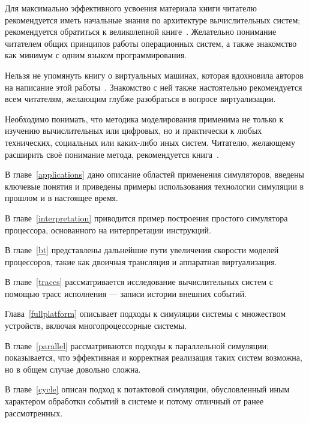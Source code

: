 Для максимально эффективного усвоения материала книги читателю рекомендуется иметь начальные знания по архитектуре вычислительных систем; рекомендуется обратиться к великолепной книге~\cite{patterson2012rus}. Желательно понимание читателем общих принципов работы операционных систем, а также знакомство как  минимум с одним языком программирования.

Нельзя не упомянуть книгу о виртуальных машинах, которая вдохновила авторов на написание этой работы~\cite{DBLP:books/daglib/0013597}. Знакомство с ней также настоятельно рекомендуется всем читателям, желающим глубже разобраться в вопросе виртуализации.

Необходимо понимать, что методика моделирования применима не только к изучению вычислительных или цифровых, но и практически к любых технических, социальных или каких-либо иных систем. Читателю, желающему расширить своё понимание метода, рекомендуется книга~\cite{system-modeling}.

В главе~\ref{applications} дано описание областей применения симуляторов, введены ключевые понятия и приведены примеры использования технологии симуляции в прошлом и в настоящее время.

В главе~\ref{interpretation} приводится пример построения простого симулятора процессора, основанного на интерпретации инструкций.

В главе~\ref{bt} представлены дальнейшие пути увеличения скорости моделей процессоров, такие как двоичная трансляция и аппаратная виртуализация.

В главе~\ref{traces} рассматривается исследование вычислительных систем с помощью трасс исполнения --- записи истории внешних событий.


Глава~\ref{fullplatform} описывает подходы к симуляции системы с множеством устройств, включая многопроцессорные системы.

В главе~\ref{parallel} рассматриваются подходы к параллельной симуляции; показывается, что эффективная и корректная реализация таких систем возможна, но в общем случае довольно сложна.

В главе~\ref{cycle} описан подход к потактовой симуляции, обусловленный иным характером обработки событий в системе и потому отличный от ранее рассмотренных.

